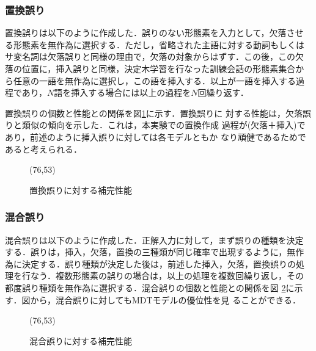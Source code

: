 \subsubsection{置換誤り}

置換誤りは以下のように作成した．誤りのない形態素を入力として，欠落させ
る形態素を無作為に選択する．ただし，省略された主語に対する動詞もしくは
サ変名詞は欠落誤りと同様の理由で，欠落の対象からはずす．この後，この欠
落の位置に，挿入誤りと同様，決定木学習を行なった訓練会話の形態素集合か
ら任意の一語を無作為に選択し，この語を挿入する．以上が一語を挿入する過
程であり，$N$語を挿入する場合には以上の過程を$N$回繰り返す．

置換誤りの個数と性能との関係を図\ref{fig:substitute}に示す．置換誤りに
対する性能は，欠落誤りと類似の傾向を示した．これは，本実験での置換作成
過程が(欠落＋挿入)であり，前述のように挿入誤りに対しては各モデルともか
なり頑健であるためであると考えられる．

\begin{figure}
\begin{center}
    \begin{epsf}
    \end{epsf}
    \begin{draft}
    \atari(76,53)
    \end{draft}
\vspace{1mm}
\caption{置換誤りに対する補完性能}
\label{fig:substitute}
\end{center}
\end{figure}


\subsubsection{混合誤り}

混合誤りは以下のように作成した．正解入力に対して，まず誤りの種類を決定
する．誤りは，挿入，欠落，置換の三種類が同じ確率で出現するように，無作
為に決定する．誤り種類が決定した後は，前述した挿入，欠落，置換誤りの処
理を行なう．複数形態素の誤りの場合は，以上の処理を複数回繰り返し，その
都度誤り種類を無作為に選択する．混合誤りの個数と性能との関係を図
{}\ref{fig:mix}に示す．図から，混合誤りに対してもMDTモデルの優位性を見
ることができる．

\begin{figure}
\begin{center}
    \begin{epsf}
    \end{epsf}
    \begin{draft}
    \atari(76,53)
    \end{draft}
\vspace{1mm}
\caption{混合誤りに対する補完性能}
\label{fig:mix}
\end{center}
\end{figure}



